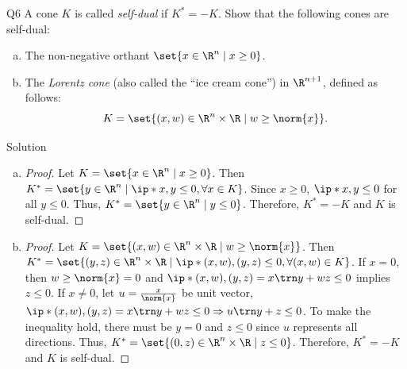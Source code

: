 \documentclass{article}
\theoremstyle{plain}
\theoremstyle{definition}
\theoremstyle{remark}
\begin{document}
\begin{problem}
    {Q6}
    A cone $K$ is called \textit{self-dual} if $K^*=-K$. Show that the following cones are self-dual:
    \begin{enumerate}[(a)]
        \item The non-negative orthant $\set{x\in\R^n\mid x\geq 0}$.
        \item The \textit{Lorentz cone} (also called the ``ice cream cone'') in $\R^{n+1}$, defined as follows: \[K=\set{(x,w)\in \R^n\times\R\mid w\geq\norm{x}}.\]
    \end{enumerate}
\end{problem}

\begin{solution}
    {Solution}
    \begin{enumerate}[(a)]
        \item {
            \begin{proof}
                Let $K=\set{x\in\R^n\mid x\geq 0}$. Then $K^*=\set{y\in\R^n\mid \ip*{x,y}\leq 0, \forall x\in K}$. Since $x\geq 0$, $\ip*{x,y}\leq 0$ for all $y\leq 0$. Thus, $K^*=\set{y\in\R^n\mid y\leq 0}$. Therefore, $K^*=-K$ and $K$ is self-dual.
            \end{proof}
        }
        \item {
            \begin{proof}
                Let $K=\set{(x,w)\in \R^n\times\R\mid w\geq\norm{x}}$. Then $K^*=\set{(y,z)\in \R^n\times\R\mid \ip*{(x,w),(y,z)}\leq 0, \forall (x,w)\in K}$. If $x=0$, then $w\geq \norm{x}=0$ and $\ip*{(x,w),(y,z)} = x\trn y+wz \leq 0$ implies $z\leq 0$. If $x\neq 0$, let $u=\frac{x}{\norm{x}}$ be unit vector, $\ip*{(x,w),(y,z)} = x\trn y+wz \leq 0 \Rightarrow u\trn y+z\leq 0$. To make the inequality hold, there must be $y=0$ and $z\leq 0$ since $u$ represents all directions. Thus, $K^*=\set{(0,z)\in \R^n\times\R\mid z\leq 0}$. Therefore, $K^*=-K$ and $K$ is self-dual.
            \end{proof}
        }
    \end{enumerate}
\end{solution}
\end{document}
